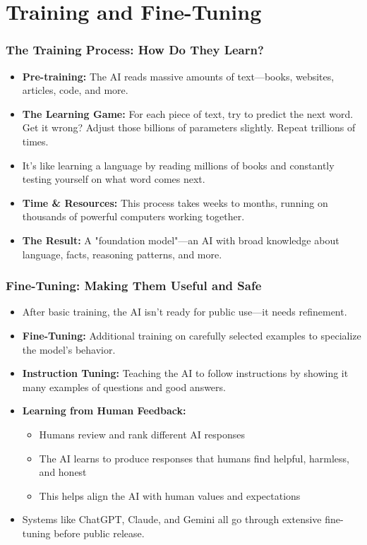 \documentclass{beamer}
\begin{document}
\section{Training and Fine-Tuning}

\begin{frame}
    \frametitle{The Training Process: How Do They Learn?}
    \begin{itemize}
        \item \textbf{Pre-training:} The AI reads massive amounts of text—books, websites, articles, code, and more.
        \item \textbf{The Learning Game:} For each piece of text, try to predict the next word. Get it wrong? Adjust those billions of parameters slightly. Repeat trillions of times.
        \item It's like learning a language by reading millions of books and constantly testing yourself on what word comes next.
        \item \textbf{Time \& Resources:} This process takes weeks to months, running on thousands of powerful computers working together.
        \item \textbf{The Result:} A "foundation model"—an AI with broad knowledge about language, facts, reasoning patterns, and more.
    \end{itemize}
\end{frame}

\begin{frame}
    \frametitle{Fine-Tuning: Making Them Useful and Safe}
    \begin{itemize}
        \item After basic training, the AI isn't ready for public use—it needs refinement.
        \item \textbf{Fine-Tuning:} Additional training on carefully selected examples to specialize the model's behavior.
        \item \textbf{Instruction Tuning:} Teaching the AI to follow instructions by showing it many examples of questions and good answers.
        \item \textbf{Learning from Human Feedback:}
        \begin{itemize}
            \item Humans review and rank different AI responses
            \item The AI learns to produce responses that humans find helpful, harmless, and honest
            \item This helps align the AI with human values and expectations
        \end{itemize}
        \item Systems like ChatGPT, Claude, and Gemini all go through extensive fine-tuning before public release.
    \end{itemize}
\end{frame}
\end{document}
